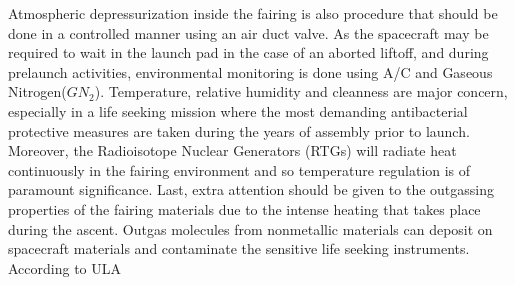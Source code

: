 Atmospheric depressurization inside the fairing is also procedure that should be done in a controlled manner using an air duct valve. As the spacecraft may be required to wait in the launch pad in the case of an aborted liftoff, and during prelaunch activities, environmental monitoring is done using A/C and Gaseous Nitrogen($GN_2$). Temperature, relative humidity and cleanness are major concern, especially in a life seeking mission where the most demanding antibacterial protective measures are taken during the years of assembly prior to launch. Moreover, the Radioisotope Nuclear Generators (RTGs) will radiate heat continuously in the fairing environment and so temperature regulation is of paramount significance. Last, extra attention should be given to the outgassing properties of the fairing materials due to the intense heating that takes place during the ascent. Outgas molecules from nonmetallic materials can deposit on spacecraft materials and contaminate the sensitive life seeking instruments. According to ULA

